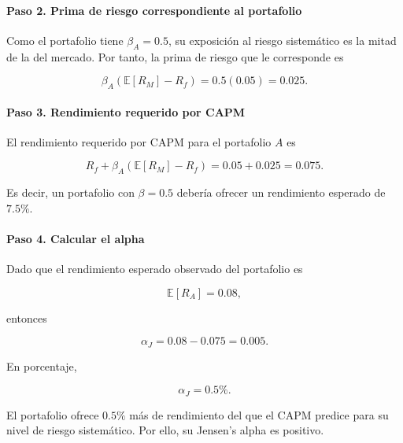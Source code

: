 \paragraph{Paso 2. Prima de riesgo correspondiente al portafolio}

Como el portafolio tiene \(\beta_A=0.5\), su exposición al riesgo sistemático
es la mitad de la del mercado. Por tanto, la prima de riesgo que le corresponde es

\[
\beta_A(\mathbb E[R_M]-R_f)=0.5(0.05)=0.025.
\]

\paragraph{Paso 3. Rendimiento requerido por CAPM}

El rendimiento requerido por CAPM para el portafolio \(A\) es

\[
R_f+\beta_A(\mathbb E[R_M]-R_f)
=
0.05+0.025
=
0.075.
\]

Es decir, un portafolio con \(\beta=0.5\) debería ofrecer un rendimiento esperado de \(7.5\%\).

\paragraph{Paso 4. Calcular el alpha}

Dado que el rendimiento esperado observado del portafolio es

\[
\mathbb E[R_A]=0.08,
\]

entonces

\[
\alpha_J
=
0.08-0.075
=
0.005.
\]

En porcentaje,

\[
\alpha_J=0.5\%.
\]


El portafolio ofrece \(0.5\%\) más de rendimiento del que el CAPM predice para su nivel
de riesgo sistemático. Por ello, su Jensen's alpha es positivo.









